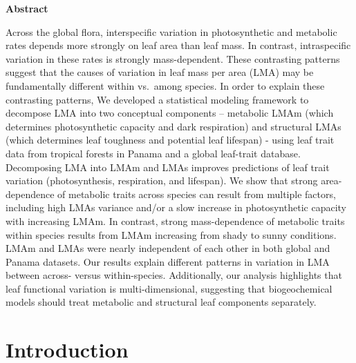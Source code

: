 \documentclass[
  12pt,
  letterpaper,
  DIV=11,
  numbers=noendperiod]{scrartcl}
\begin{document}
\textbf{Abstract}

Across the global flora, interspecific variation in photosynthetic and
metabolic rates depends more strongly on leaf area than leaf mass. In
contrast, intraspecific variation in these rates is strongly
mass-dependent. These contrasting patterns suggest that the causes of
variation in leaf mass per area (LMA) may be fundamentally different
within vs.~among species. In order to explain these contrasting
patterns, We developed a statistical modeling framework to decompose LMA
into two conceptual components -- metabolic LMAm (which determines
photosynthetic capacity and dark respiration) and structural LMAs (which
determines leaf toughness and potential leaf lifespan) - using leaf
trait data from tropical forests in Panama and a global leaf-trait
database. Decomposing LMA into LMAm and LMAs improves predictions of
leaf trait variation (photosynthesis, respiration, and lifespan). We
show that strong area-dependence of metabolic traits across species can
result from multiple factors, including high LMAs variance and/or a slow
increase in photosynthetic capacity with increasing LMAm. In contrast,
strong mass-dependence of metabolic traits within species results from
LMAm increasing from shady to sunny conditions. LMAm and LMAs were
nearly independent of each other in both global and Panama datasets. Our
results explain different patterns in variation in LMA between across-
versus within-species. Additionally, our analysis highlights that leaf
functional variation is multi-dimensional, suggesting that
biogeochemical models should treat metabolic and structural leaf
components separately.

\hypertarget{introduction}{%
\section{Introduction}\label{introduction}}
\end{document}
